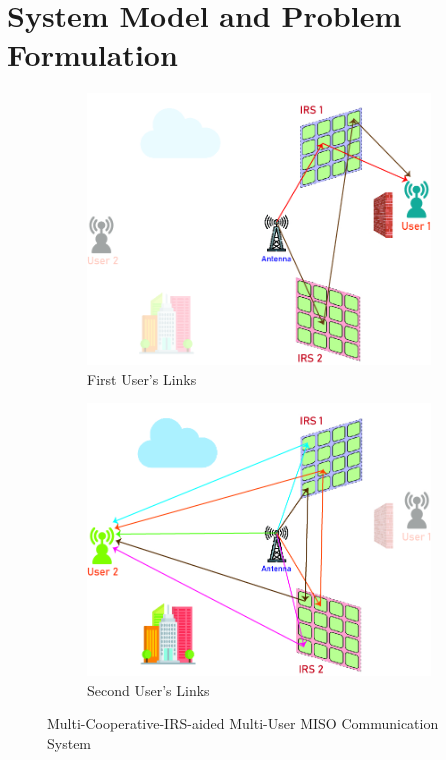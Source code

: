 \documentclass[review]{elsarticle}
\begin{document}
	\section{System Model and Problem Formulation}
		\begin{figure}[]
			\centering
			\begin{subfigure}{.5\textwidth}
				\flushleft
				\includegraphics[width=.9\linewidth]{System_Figure2_user1}
				\caption{First User's Links}
				\label{fig:sub2}
			\end{subfigure}%
			\vline
			\begin{subfigure}{.5\textwidth}
				\flushright			\includegraphics[width=.9\linewidth]{System_Figure2_user2}
				\caption{Second User's Links}
				\label{fig:sub1}
			\end{subfigure}
			\caption{Multi-Cooperative-IRS-aided Multi-User MISO Communication System}
			\label{fig:test}
		\end{figure}
		
\end{document}
